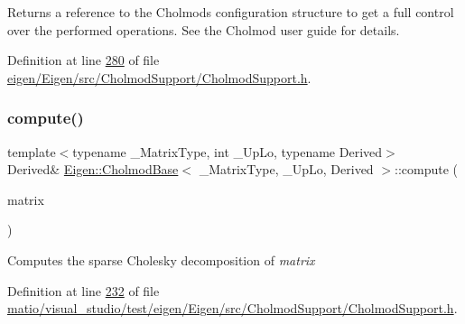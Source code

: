 Returns a reference to the Cholmod\textquotesingle{}s configuration structure to get a full control over the performed operations. See the Cholmod user guide for details. 

Definition at line \hyperlink{eigen_2_eigen_2src_2_cholmod_support_2_cholmod_support_8h_source_l00280}{280} of file \hyperlink{eigen_2_eigen_2src_2_cholmod_support_2_cholmod_support_8h_source}{eigen/\+Eigen/src/\+Cholmod\+Support/\+Cholmod\+Support.\+h}.

\mbox{\label{class_eigen_1_1_cholmod_base_abaf5be01b1e3035a4de0b19f5b63549e}} 
\subsubsection{\texorpdfstring{compute()}{compute()}\hspace{0.1cm}{\footnotesize\ttfamily [1/2]}}
{\footnotesize\ttfamily template$<$typename \+\_\+\+Matrix\+Type, int \+\_\+\+Up\+Lo, typename Derived$>$ \\
Derived\& \hyperlink{class_eigen_1_1_cholmod_base}{Eigen\+::\+Cholmod\+Base}$<$ \+\_\+\+Matrix\+Type, \+\_\+\+Up\+Lo, Derived $>$\+::compute (\begin{DoxyParamCaption}\item[{const Matrix\+Type \&}]{matrix }\end{DoxyParamCaption})\hspace{0.3cm}{\ttfamily [inline]}}

Computes the sparse Cholesky decomposition of {\itshape matrix} 

Definition at line \hyperlink{matio_2visual__studio_2test_2eigen_2_eigen_2src_2_cholmod_support_2_cholmod_support_8h_source_l00232}{232} of file \hyperlink{matio_2visual__studio_2test_2eigen_2_eigen_2src_2_cholmod_support_2_cholmod_support_8h_source}{matio/visual\+\_\+studio/test/eigen/\+Eigen/src/\+Cholmod\+Support/\+Cholmod\+Support.\+h}.

\mbox{\label{class_eigen_1_1_cholmod_base_abaf5be01b1e3035a4de0b19f5b63549e}} 
